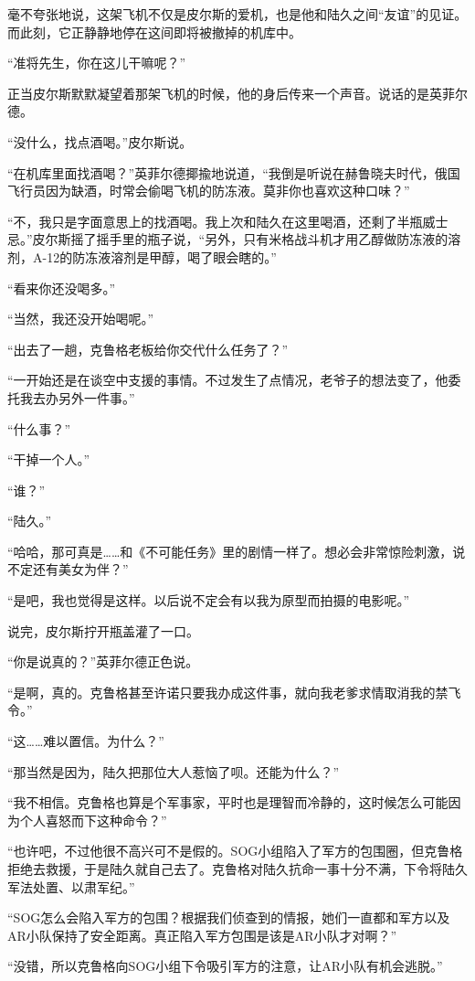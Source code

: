 毫不夸张地说，这架飞机不仅是皮尔斯的爱机，也是他和陆久之间“友谊”的见证。而此刻，它正静静地停在这间即将被撤掉的机库中。

“准将先生，你在这儿干嘛呢？”

正当皮尔斯默默凝望着那架飞机的时候，他的身后传来一个声音。说话的是英菲尔德。

“没什么，找点酒喝。”皮尔斯说。

“在机库里面找酒喝？”英菲尔德揶揄地说道，“我倒是听说在赫鲁晓夫时代，俄国飞行员因为缺酒，时常会偷喝飞机的防冻液。莫非你也喜欢这种口味？”

“不，我只是字面意思上的找酒喝。我上次和陆久在这里喝酒，还剩了半瓶威士忌。”皮尔斯摇了摇手里的瓶子说，“另外，只有米格战斗机才用乙醇做防冻液的溶剂，A-12的防冻液溶剂是甲醇，喝了眼会瞎的。”

“看来你还没喝多。”

“当然，我还没开始喝呢。”

“出去了一趟，克鲁格老板给你交代什么任务了？”

“一开始还是在谈空中支援的事情。不过发生了点情况，老爷子的想法变了，他委托我去办另外一件事。”

“什么事？”

“干掉一个人。”

“谁？”

“陆久。”

“哈哈，那可真是……和《不可能任务》里的剧情一样了。想必会非常惊险刺激，说不定还有美女为伴？”

“是吧，我也觉得是这样。以后说不定会有以我为原型而拍摄的电影呢。”

说完，皮尔斯拧开瓶盖灌了一口。

“你是说真的？”英菲尔德正色说。

“是啊，真的。克鲁格甚至许诺只要我办成这件事，就向我老爹求情取消我的禁飞令。”

“这……难以置信。为什么？”

“那当然是因为，陆久把那位大人惹恼了呗。还能为什么？”

“我不相信。克鲁格也算是个军事家，平时也是理智而冷静的，这时候怎么可能因为个人喜怒而下这种命令？”

“也许吧，不过他很不高兴可不是假的。SOG小组陷入了军方的包围圈，但克鲁格拒绝去救援，于是陆久就自己去了。克鲁格对陆久抗命一事十分不满，下令将陆久军法处置、以肃军纪。”

“SOG怎么会陷入军方的包围？根据我们侦查到的情报，她们一直都和军方以及AR小队保持了安全距离。真正陷入军方包围是该是AR小队才对啊？”

“没错，所以克鲁格向SOG小组下令吸引军方的注意，让AR小队有机会逃脱。”


